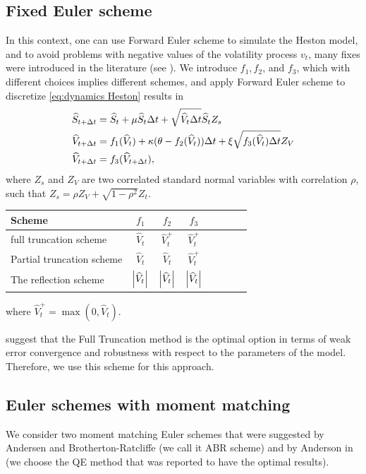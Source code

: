 \subsection{Fixed Euler scheme}\label{sec:Discretization of Heston model with a non smooth transformations for the volatility process}
In this context, one can use Forward Euler scheme to simulate the Heston model, and to avoid  problems with negative values of the volatility process $v_t$, many fixes  were introduced in the literature (see \cite{lord2010comparison}). We introduce $f_1, f_2$, and $f_3$, which with different choices implies different schemes, and   apply Forward Euler scheme to discretize \ref{eq:dynamics Heston}  results in
\begin{align}\label{eq:FE_Heston_discrete}
\widehat{S}_{t+\Delta t}&= \widehat{S}_t +\mu \widehat{S}_t \Delta t+\sqrt{\widehat{V}_t \Delta t} \widehat{S}_t Z_s \nonumber\\
\widehat{V}_{t+\Delta t}&=f_1(\widehat{V}_t)+\kappa (\theta-f_2(\widehat{V}_t)) \Delta t+\xi \sqrt{f_3(\widehat{V}_t) \Delta t} Z_V \nonumber\\
\widehat{V}_{t+\Delta t}&=f_3(\widehat{V}_{t+\Delta t}) ,
\end{align}
where $Z_s$ and $Z_V$  are two correlated standard normal variables with correlation $\rho$, such that $Z_s=\rho Z_V+\sqrt{1-\rho^2} Z_t$. 

\FloatBarrier
\begin{table}[h!]
	\centering
	\begin{tabular}{l*{6}{c}r}
		\toprule[1.5pt]
	Scheme &  $f_1$& $f_2$  & $f_3$     \\
	\hline
	full truncation scheme & $\hat{V}_t$ &  $\hat{V}_t^+$&$\hat{V}_t^+$\\
	Partial truncation scheme & $\hat{V}_t$ &  $\hat{V}_t$&$\hat{V}_t^+$\\
	The reflection scheme  &$\left\lvert\widehat{V}_t\right\rvert$ & $\left\lvert\widehat{V}_t\right\rvert$& $\left\lvert\widehat{V}_t\right\rvert$\\
			\bottomrule[1.25pt]
	\end{tabular}
	\label{Numerical schemes for CIR process}
\end{table}
\FloatBarrier
where  $\hat{V}_t^+=\max(0,\hat{V}_t)$.

\cite{lord2010comparison} suggest that the Full Truncation method is the optimal option in terms of weak error convergence and robustness with respect to the parameters of the model. Therefore,  we use this scheme for this approach. 

\subsection{Euler schemes with moment matching}\label{sec:Euler schemes with moment matching}
We consider two moment matching Euler schemes that were suggested by Andersen and Brotherton-Ratcliffe \cite{andersen2005extended} (we call it ABR scheme) and by Anderson in \cite{andersen2007efficient} (we choose the QE method that was reported to have the optimal results). 
